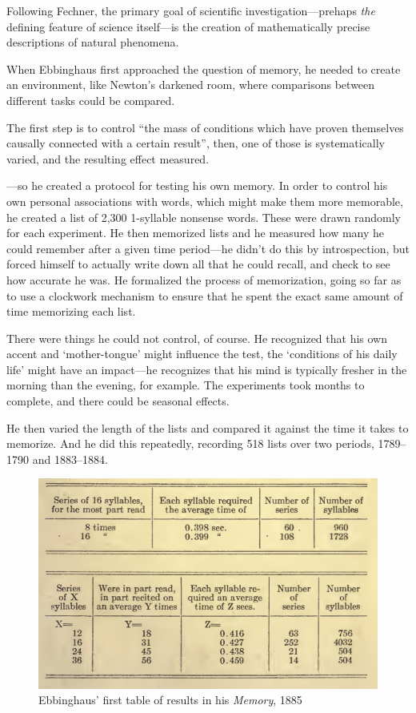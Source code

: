 \begin{refsection}
Following Fechner, the primary goal of scientific investigation---prehaps \emph{the} defining feature of science itself---is the creation of mathematically precise descriptions of natural phenomena. 

When Ebbinghaus first approached the question of memory, he needed to create an environment, like Newton's darkened room, where comparisons between different tasks could be compared. 

The first step is to control ``the mass of conditions which have proven themselves causally connected with a certain result'', then, one of those is systematically varied, and the resulting effect measured.

---so he created a protocol for testing his own memory. In order to control his own personal associations with words, which might make them more memorable, he created a list of 2,300 1-syllable nonsense words. These were drawn randomly for each experiment. He then memorized lists and he measured how many he could remember after a given time period---he didn't do this by introspection, but forced himself to actually write down all that he could recall, and check to see how accurate he was. He formalized the process of memorization, going so far as to use a clockwork mechanism to ensure that he spent the exact same amount of time memorizing each list.

There were things he could not control, of course. He recognized that his own accent and `mother-tongue' might influence the test, the `conditions of his daily life' might have an impact---he recognizes that his mind is typically fresher in the morning than the evening, for example. The experiments took months to complete, and there could be seasonal effects. 

He then varied the length of the lists and compared it against the time it takes to memorize. And he did this repeatedly, recording 518 lists over two periods, 1789--1790 and 1883--1884.
\begin{figure}\includegraphics{../images/ebbinghaus1885.png}\caption{Ebbinghaus' first table of results in his \emph{Memory}, 1885}\label{fig:ebbinghaus1}\end{figure}


\end{refsection}
